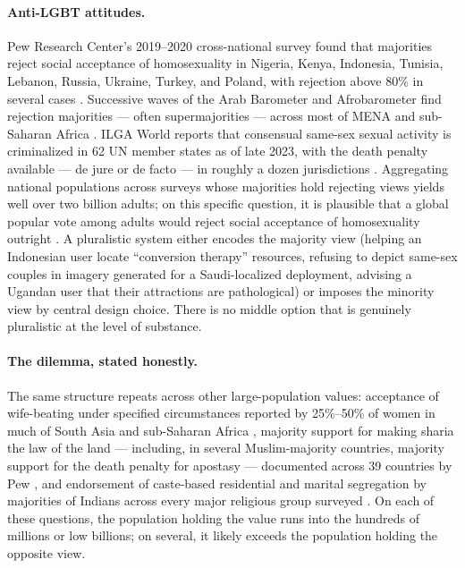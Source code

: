 \documentclass{article}
\theoremstyle{plain}
\theoremstyle{definition}
\theoremstyle{remark}
\begin{document}
\paragraph{Anti-LGBT attitudes.}
Pew Research Center's 2019--2020 cross-national survey found that majorities reject social acceptance of homosexuality in Nigeria, Kenya, Indonesia, Tunisia, Lebanon, Russia, Ukraine, Turkey, and Poland, with rejection above 80\% in several cases \citep{pew2020homosexuality}. Successive waves of the Arab Barometer and Afrobarometer find rejection majorities --- often supermajorities --- across most of MENA and sub-Saharan Africa \citep{arabbarometer2022, afrobarometer2023}. ILGA World reports that consensual same-sex sexual activity is criminalized in 62 UN member states as of late 2023, with the death penalty available --- de jure or de facto --- in roughly a dozen jurisdictions \citep{ilga2023statesponsored}. Aggregating national populations across surveys whose majorities hold rejecting views yields well over two billion adults; on this specific question, it is plausible that a global popular vote among adults would reject social acceptance of homosexuality outright \citep{pew2020homosexuality, arabbarometer2022, afrobarometer2023}. A pluralistic system either encodes the majority view (helping an Indonesian user locate ``conversion therapy'' resources, refusing to depict same-sex couples in imagery generated for a Saudi-localized deployment, advising a Ugandan user that their attractions are pathological) or imposes the minority view by central design choice. There is no middle option that is genuinely pluralistic at the level of substance.

\paragraph{The dilemma, stated honestly.}
The same structure repeats across other large-population values: acceptance of wife-beating under specified circumstances reported by 25\%--50\% of women in much of South Asia and sub-Saharan Africa \citep{unicef2014hidden, unwomen2024progress}, majority support for making sharia the law of the land --- including, in several Muslim-majority countries, majority support for the death penalty for apostasy --- documented across 39 countries by Pew \citep{pew2013worldsmuslims}, and endorsement of caste-based residential and marital segregation by majorities of Indians across every major religious group surveyed \citep{pew2021india}. On each of these questions, the population holding the value runs into the hundreds of millions or low billions; on several, it likely exceeds the population holding the opposite view.
\end{document}
